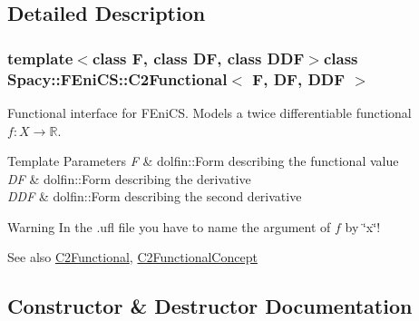 \subsection{Detailed Description}
\subsubsection*{template$<$class F, class D\+F, class D\+D\+F$>$class Spacy\+::\+F\+Eni\+C\+S\+::\+C2\+Functional$<$ F, D\+F, D\+D\+F $>$}

Functional interface for F\+Eni\+C\+S. Models a twice differentiable functional $f:X\rightarrow \mathbb{R}$. 


\begin{DoxyTemplParams}{Template Parameters}
{\em F} & dolfin\+::\+Form describing the functional value \\
\hline
{\em D\+F} & dolfin\+::\+Form describing the derivative \\
\hline
{\em D\+D\+F} & dolfin\+::\+Form describing the second derivative \\
\hline
\end{DoxyTemplParams}
\begin{DoxyWarning}{Warning}
In the .ufl file you have to name the argument of $f$ by \char`\"{}x\char`\"{}! 
\end{DoxyWarning}
\begin{DoxySeeAlso}{See also}
\hyperlink{group__SpacyGroup_gaf5b89e117806134b06a1ce4629fb2b65_C2FunctionalAnchor}{C2\+Functional}, \hyperlink{group__ConceptGroup_gafb4414561b07b27100cad81ecf152e47_C2FunctionalConceptAnchor}{C2\+Functional\+Concept} 
\end{DoxySeeAlso}


\subsection{Constructor \& Destructor Documentation}
\hypertarget{classSpacy_1_1FEniCS_1_1C2Functional_a8f32c233a72dc3d25a656c1db12af943_a8f32c233a72dc3d25a656c1db12af943}{}
